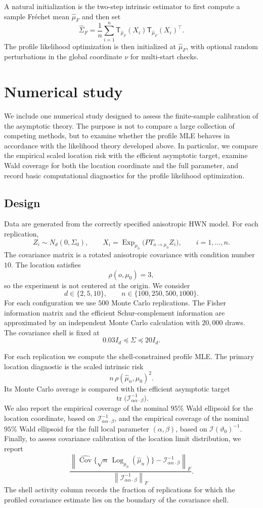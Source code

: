 \documentclass[11pt]{article}
\DeclareMathOperator{\tr}{tr}
\DeclareMathOperator{\Cov}{Cov}
\newcommand{\Exp}{\operatorname{Exp}}
\newcommand{\Log}{\operatorname{Log}}
\newcommand{\info}{\mathcal{I}}
\newcommand{\T}{\mathsf{T}}
\begin{document}
A natural initialization is the two-step intrinsic estimator to first compute a sample Fr\'echet mean $\hat\mu_F$ and then set
\[
\hat\Sigma_F
=
\frac1n\sum_{i=1}^n
\T_{\hat\mu_F}(X_i)\T_{\hat\mu_F}(X_i)^\top .
\]
The profile likelihood optimization is then initialized at $\hat\mu_F$, with optional random perturbations in the global coordinate $\nu$ for multi-start checks. 


\section{Numerical study}
\label{sec:numerical}

We include one numerical study designed to assess the finite-sample calibration of the asymptotic theory. The purpose is not to compare a large collection of competing methods, but to examine whether the profile MLE behaves in accordance with the likelihood theory developed above. In particular, we compare the empirical scaled location risk with the efficient asymptotic target, examine Wald coverage for both the location coordinate and the full parameter, and record basic computational diagnostics for the profile likelihood optimization.

\subsection{Design}

Data are generated from the correctly specified anisotropic HWN model. For each replication,
\[
Z_i\sim N_d(0,\Sigma_0),
\qquad
X_i=\Exp_{\mu_0}\bigl(PT_{o\to\mu_0}Z_i\bigr),
\qquad i=1,\dots,n .
\]
The covariance matrix is a rotated anisotropic covariance with condition number \(10\). The location satisfies
\[
\rho(o,\mu_0)=3,
\]
so the experiment is not centered at the origin. We consider
\[
d\in\{2,5,10\},
\qquad
n\in\{100,250,500,1000\}.
\]
For each configuration we use \(500\) Monte Carlo replications. The Fisher information matrix and the efficient Schur-complement information are approximated by an independent Monte Carlo calculation with \(20{,}000\) draws. The covariance shell is fixed at
\[
0.03 I_d\preceq \Sigma\preceq 20 I_d .
\]

For each replication we compute the shell-constrained profile MLE. The primary location diagnostic is the scaled intrinsic risk
\[
n\,\rho(\hat\mu_n,\mu_0)^2 .
\]
Its Monte Carlo average is compared with the efficient asymptotic target
\[
\tr\bigl(\info_{\alpha\alpha\cdot\beta}^{-1}\bigr).
\]
We also report the empirical coverage of the nominal \(95\%\) Wald ellipsoid for the location coordinate, based on \(\info_{\alpha\alpha\cdot\beta}^{-1}\), and the empirical coverage of the nominal \(95\%\) Wald ellipsoid for the full local parameter \((\alpha,\beta)\), based on \(\info(\vartheta_0)^{-1}\). Finally, to assess covariance calibration of the location limit distribution, we report
\[
\frac{
\left\|
\widehat{\Cov}\{\sqrt n\,\Log_{\mu_0}(\hat\mu_n)\}
-
\info_{\alpha\alpha\cdot\beta}^{-1}
\right\|_F
}{
\left\|
\info_{\alpha\alpha\cdot\beta}^{-1}
\right\|_F
}.
\]
The shell activity column records the fraction of replications for which the profiled covariance estimate lies on the boundary of the covariance shell.
\end{document}
